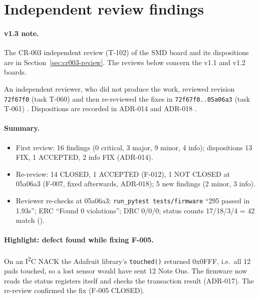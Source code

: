 \section{Independent review findings}
\label{sec:review}

\paragraph{v1.3 note.} The CR-003 independent review (T-102) of the SMD board and
its dispositions are in Section~\ref{sec:cr003-review}. The reviews below concern
the v1.1 and v1.2 boards.

An independent reviewer, who did not produce the work, reviewed revision
\texttt{72f67f0} (task T-060)  and then
re-reviewed the fixes in \texttt{72f67f0..05a06a3} (task T-061)
. Dispositions are recorded in ADR-014 and
ADR-018 .

\paragraph{Summary.}
\begin{itemize}[noitemsep]
  \item First review: 16 findings (0 critical, 3 major, 9 minor, 4 info);
        dispositions 13 FIX, 1 ACCEPTED, 2 info FIX (ADR-014).
  \item Re-review: 14 CLOSED, 1 ACCEPTED (F-012), 1 NOT CLOSED at 05a06a3 (F-007,
        fixed afterwards, ADR-018); 5 new findings (2 minor, 3 info).
  \item Reviewer re-checks at 05a06a3: \texttt{run\_pytest tests/firmware}
        ``295 passed in 1.93s''; ERC ``Found 0 violations''; DRC 0/0/0; status
        counts 17/18/3/4 = 42 match ().
\end{itemize}

\paragraph{Highlight: defect found while fixing F-005.} On an I\textsuperscript{2}C
NACK the Adafruit library's \texttt{touched()} returned 0x0FFF, i.e.\ all 12 pads
touched, so a lost sensor would have sent 12 Note Ons. The firmware now reads the
status registers itself and checks the transaction result (ADR-017). The re-review
confirmed the fix (F-005 CLOSED).

